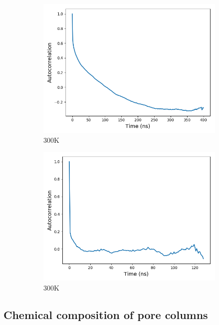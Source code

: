 \documentclass[journal=jpcbfk,manusciprt=article]{achemso}
\begin{document}
  \begin{figure}
  \centering
  \begin{subfigure}{0.45\textwidth}
  	\centering
  	\includegraphics[width=\textwidth]{dihedral_autocorrelation_300K.png}
  	\caption{300K}\label{fig:dihedrals_300K}
  \end{subfigure}
  \begin{subfigure}{0.45\textwidth}
  	\centering
  	\includegraphics[width=\textwidth]{dihedral_autocorrelation_500K.png}
  	\caption{300K}\label{fig:dihedrals_500K}
  \end{subfigure}
  \caption{}\label{fig:dihedrals}
  \end{figure}

  \subsection{Chemical composition of pore columns}
\end{document}
